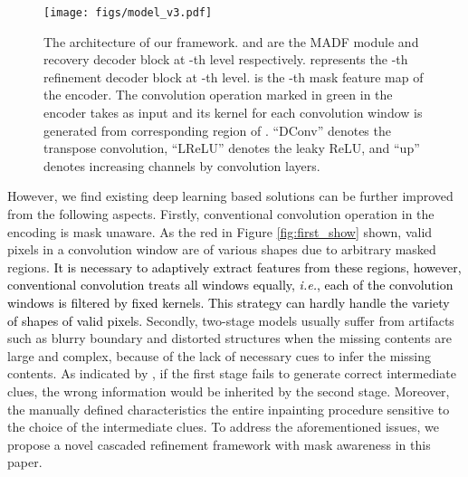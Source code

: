 \documentclass[journal]{IEEEtran}
\begin{document}
\begin{figure*}[t]
\centering
\texttt{[image: figs/model\_v3.pdf]}
\caption{The architecture of our framework.  and  are the MADF module and recovery decoder block at -th level respectively.  represents the -th refinement decoder block at -th level. 
 is the -th mask feature map of the encoder. The convolution operation marked in green in the encoder takes  as input and its kernel for each convolution window is generated from corresponding region of . 
``DConv'' denotes the transpose convolution, ``LReLU'' denotes the leaky ReLU, and ``up'' denotes increasing channels by  convolution layers. {\color{black}{ and  are inputs to  to generate the feature map  at the recovery decoder and  takes  and  as input and generates feature map . Note that  and  are all equivalent to  and  equals .}}
}
\label{fig:framework}
\end{figure*}
However, we find existing deep learning based solutions can be further improved from the following aspects. Firstly, conventional convolution operation in the encoding {\color{black}{phase}} is mask unaware. As the red {\color{black}{boxes}} in Figure \ref{fig:first_show} shown, valid pixels in a convolution window are of various shapes due to arbitrary masked regions. 
\textcolor{black}{
It is necessary to adaptively extract features from these regions, however, conventional convolution treats all windows equally, \textit{i.e.}, each of the convolution windows is filtered by fixed kernels. This strategy can hardly handle the variety of shapes of valid pixels.     
}
Secondly, two-stage models usually suffer from artifacts such as blurry boundary and distorted structures when the missing contents are large and complex, because of the lack of necessary cues to infer the missing contents. As indicated by \cite{wang2018image}, if the first stage fails to generate correct intermediate clues, the wrong information would be inherited by the second stage. 
Moreover, the manually defined characteristics {\color{black}{make}} the entire inpainting procedure sensitive to the choice of the intermediate clues.
To address the aforementioned issues, we propose a novel cascaded refinement framework with mask awareness in this paper. 
\end{document}
